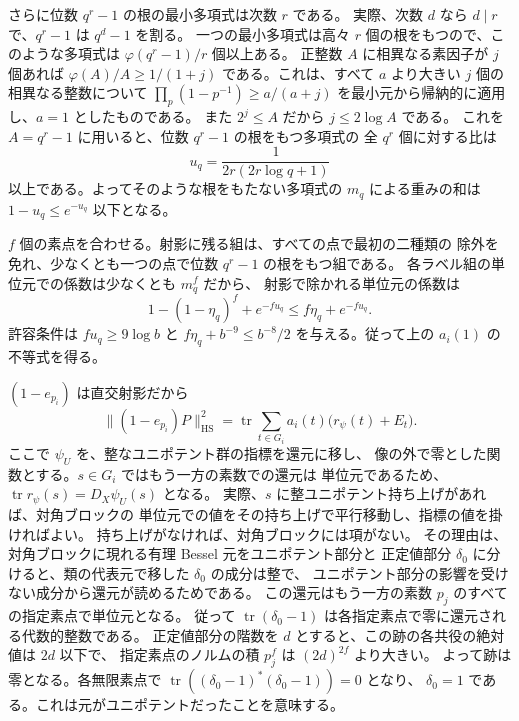 さらに位数 \(q^r-1\) の根の最小多項式は次数 \(r\) である。
実際、次数 \(d\) なら \(d\mid r\) で、\(q^r-1\) は \(q^d-1\) を割る。
一つの最小多項式は高々 \(r\) 個の根をもつので、このような多項式は
\(\varphi(q^r-1)/r\) 個以上ある。
正整数 \(A\) に相異なる素因子が \(j\) 個あれば
\(\varphi(A)/A\ge1/(1+j)\) である。これは、すべて \(a\) より大きい
\(j\) 個の相異なる整数について \(\prod_p(1-p^{-1})\ge a/(a+j)\)
を最小元から帰納的に適用し、\(a=1\) としたものである。
また \(2^j\le A\) だから \(j\le2\log A\) である。
これを \(A=q^r-1\) に用いると、位数 \(q^r-1\) の根をもつ多項式の
全 \(q^r\) 個に対する比は
\[
 u_q=\frac{1}{2r(2r\log q+1)}
\]
以上である。よってそのような根をもたない多項式の \(m_q\) による重みの和は
\(1-u_q\le e^{-u_q}\) 以下となる。

\(f\) 個の素点を合わせる。射影に残る組は、すべての点で最初の二種類の
除外を免れ、少なくとも一つの点で位数 \(q^r-1\) の根をもつ組である。
各ラベル組の単位元での係数は少なくとも \(m_q^f\) だから、
射影で除かれる単位元の係数は
\[
 1-(1-\eta_q)^f+e^{-fu_q}\le f\eta_q+e^{-fu_q}.
\]
許容条件は \(fu_q\ge9\log b\) と \(f\eta_q+b^{-9}\le b^{-8}/2\)
を与える。従って上の \(a_i(1)\) の不等式を得る。

\((1-e_{p_i})\) は直交射影だから
\[
 \|(1-e_{p_i})P\|_{\mathrm{HS}}^2
  =\operatorname{tr}\sum_{t\in G_i} a_i(t)\bigl(r_\psi(t)+E_t\bigr).
\]
ここで \(\psi_U\) を、整なユニポテント群の指標を還元に移し、
像の外で零とした関数とする。\(s\in G_i\) ではもう一方の素数での還元は
単位元であるため、\(\operatorname{tr}r_\psi(s)=D_X\psi_U(s)\) となる。
実際、\(s\) に整ユニポテント持ち上げがあれば、対角ブロックの
単位元での値をその持ち上げで平行移動し、指標の値を掛ければよい。
持ち上げがなければ、対角ブロックには項がない。
その理由は、対角ブロックに現れる有理 Bessel 元をユニポテント部分と
正定値部分 \(\delta_0\) に分けると、類の代表元で移した \(\delta_0\) の成分は整で、
ユニポテント部分の影響を受けない成分から還元が読めるためである。
この還元はもう一方の素数 \(p_j\) のすべての指定素点で単位元となる。
従って \(\operatorname{tr}(\delta_0-1)\) は各指定素点で零に還元される代数的整数である。
正定値部分の階数を \(d\) とすると、この跡の各共役の絶対値は \(2d\) 以下で、
指定素点のノルムの積 \(p_j^f\) は \((2d)^{2f}\) より大きい。
よって跡は零となる。各無限素点で
\(\operatorname{tr}((\delta_0-1)^*(\delta_0-1))=0\) となり、
\(\delta_0=1\) である。これは元がユニポテントだったことを意味する。

